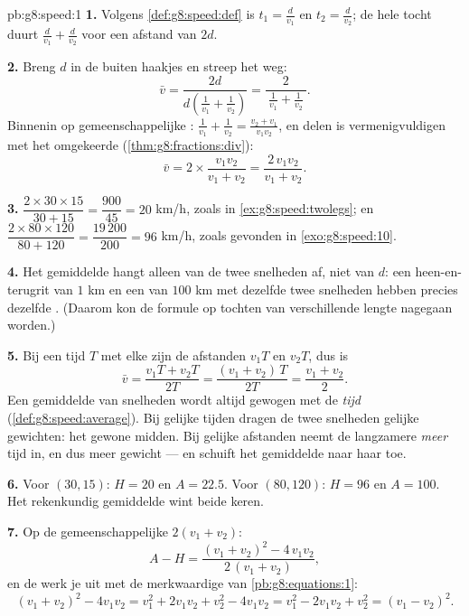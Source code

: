 \begin{solution}{pb:g8:speed:1}
\textbf{1.} Volgens \cref{def:g8:speed:def} is $t_1 = \frac{d}{v_1}$ en
$t_2 = \frac{d}{v_2}$; de hele tocht duurt $\frac{d}{v_1} + \frac{d}{v_2}$ voor
een afstand van $2d$.

\textbf{2.} Breng $d$ in de  buiten haakjes en streep het weg:
\[
\bar v
= \frac{2d}{d\left(\frac{1}{v_1} + \frac{1}{v_2}\right)}
= \frac{2}{\ \frac{1}{v_1} + \frac{1}{v_2}\ } .
\]
Binnenin op gemeenschappelijke :
$\frac{1}{v_1} + \frac{1}{v_2} = \frac{v_2 + v_1}{v_1 v_2}$, en delen is
vermenigvuldigen met het omgekeerde (\cref{thm:g8:fractions:div}):
\[
\bar v = 2 \times \frac{v_1 v_2}{v_1 + v_2}
= \frac{2\, v_1 v_2}{v_1 + v_2} .
\]

\textbf{3.} $\dfrac{2 \times 30 \times 15}{30 + 15} = \dfrac{900}{45} = 20$ km/h,
zoals in \cref{ex:g8:speed:twolegs}; en
$\dfrac{2 \times 80 \times 120}{80 + 120} = \dfrac{19\,200}{200} = 96$ km/h,
zoals gevonden in \cref{exo:g8:speed:10}.

\textbf{4.} Het gemiddelde hangt alleen van de twee snelheden af, niet van $d$:
een heen-en-terugrit van $1$ km en een van $100$ km met dezelfde twee snelheden
hebben precies dezelfde . (Daarom kon de formule op tochten van
verschillende lengte nagegaan worden.)

\textbf{5.} Bij een tijd $T$ met elke  zijn de afstanden $v_1 T$ en
$v_2 T$, dus is
\[
\bar v = \frac{v_1 T + v_2 T}{2T}
= \frac{(v_1 + v_2)\,T}{2T}
= \frac{v_1 + v_2}{2} .
\]
Een gemiddelde van snelheden wordt altijd gewogen met de \emph{tijd}
(\cref{def:g8:speed:average}). Bij gelijke tijden dragen de twee snelheden
gelijke gewichten: het gewone midden. Bij gelijke afstanden neemt de langzamere
 \emph{meer} tijd in, en dus meer gewicht --- en schuift het gemiddelde
naar haar toe.

\textbf{6.} Voor $(30, 15)$: $H = 20$ en $A = 22.5$. Voor $(80, 120)$: $H = 96$
en $A = 100$. Het rekenkundig gemiddelde wint beide keren.

\textbf{7.} Op de gemeenschappelijke  $2(v_1 + v_2)$:
\[
A - H
= \frac{(v_1 + v_2)^2 - 4\, v_1 v_2}{2\,(v_1 + v_2)} ,
\]
en de  werk je uit met de merkwaardige  van
\cref{pb:g8:equations:1}:
\[
(v_1 + v_2)^2 - 4 v_1 v_2
= v_1^2 + 2 v_1 v_2 + v_2^2 - 4 v_1 v_2
= v_1^2 - 2 v_1 v_2 + v_2^2
= (v_1 - v_2)^2 .
\]


\end{solution}
